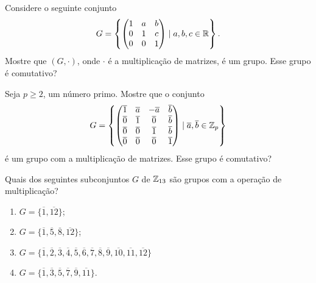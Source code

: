 \documentclass[12pt]{exam}
\begin{document}
    \vspace{.3cm}

    \questao{} Considere o seguinte conjunto
    \[
        G = \left\{\begin{pmatrix} 1 & a & b\\ 0 & 1 & c \\ 0 & 0 & 1\end{pmatrix} \mid a, b, c \in \mathbb{R}\right\}.
    \]
    Mostre que $(G, \cdot)$, onde $\cdot$ é a multiplicação de matrizes, é um grupo. Esse grupo é comutativo?

    \vspace{.3cm}

    \questao{} Seja $p \ge 2$, um número primo. Mostre que o conjunto
    \[
        G = \left\{
                    \begin{pmatrix}
                        \overline{1} & \overline{a} & -\overline{a} & \overline{b}\\
                        \overline{0} & \overline{1} & \overline{0} & \overline{b}\\
                        \overline{0} & \overline{0} & \overline{1} & \overline{b}\\
                        \overline{0} & \overline{0} & \overline{0} & \overline{1}\\
                    \end{pmatrix}
                \mid \overline{a}, \overline{b} \in \mathbb{Z}_p
            \right\}
    \]
    é um grupo com a multiplicação de matrizes. Esse grupo é comutativo?
    \vspace{.3cm}

    \questao{} Quais dos seguintes subconjuntos $G$ de $\mathbb{Z}_{13}$ são grupos
    com a operação de multiplicação?
    \begin{multicols}{2}
        \begin{enumerate}[label=({\alph*})]
            \item $G=\{\overline{1},\overline{12}\}$;

            \item $G=\{\overline{1},\overline{5},\overline{8},\overline{12}\}$;

            \item $G=\{\overline{1},\overline{2},\overline{3},\overline{4}, \overline{5},\overline{6},\overline{7}, \overline{8},\overline{9},\overline{10},\overline{11},\overline{12}\}$

            \item $G=\{\overline{1}, \overline{3},\overline{5},\overline{7},\overline{9},\overline{11}\}$.
        \end{enumerate}
    \end{multicols}
\end{document}
